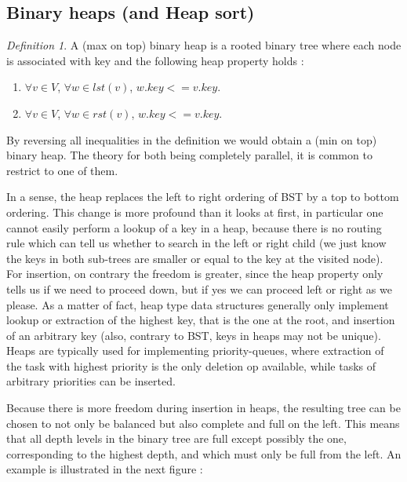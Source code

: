 \documentclass[12pt]{article}
\theoremstyle{plain}
\theoremstyle{remark}
\newtheorem*{definition}{Definition}
\begin{document}
\subsection{Binary heaps (and Heap sort)}

\begin{definition}
	A (max on top) binary heap is a rooted binary tree where each node is associated with 
	key and the following heap property holds :
	\begin{enumerate}
		\item $\forall v \in V$, $\forall w \in lst(v)$, $w.key <=
			v.key$.
		\item $\forall v \in V$, $\forall w \in rst(v)$, $w.key <=
			v.key$.
	\end{enumerate}
\end{definition}

By reversing all inequalities in the definition we would obtain a (min on top)
binary heap. The theory for both being completely parallel, it is common to
restrict to one of them. 

\medskip

In a sense, the heap replaces the left to right ordering of BST by a top to
bottom ordering. This change is more profound than it looks at first, in
particular one cannot easily perform a lookup of a key in a heap, because
there is no routing rule which can tell us whether to search in the left or
right child (we just know the keys in both sub-trees are smaller or equal to the
key at the visited node). For insertion, on contrary the freedom is greater,
since the heap property only tells us if we need to proceed down, but if yes we
can proceed left or right as we please. As a matter of fact, heap type data 
structures generally only implement lookup or extraction of the highest key, that is the one at the
root, and insertion of an arbitrary key (also, contrary to BST, keys in heaps may
not be unique). Heaps are typically used for implementing priority-queues, where extraction
of the task with highest priority is the only deletion op available, while
tasks of arbitrary priorities can be inserted.

\medskip

Because there is more freedom during insertion in heaps, the resulting tree can
be chosen to not only be balanced but also complete and full on the left. This means 
that all depth levels in the binary tree are full except possibly the one, 
corresponding to the highest depth, and which must only be full from the left.
An example is illustrated in the next figure :
\end{document}
